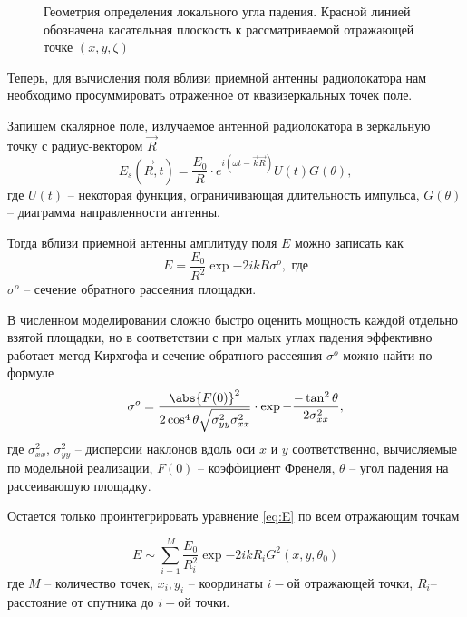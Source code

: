 \begin{figure}[h!]
    \centering
    \def\svgwidth{0.75\linewidth}
    
    \caption{Геометрия определения локального угла падения. Красной линией
    обозначена касательная плоскость к рассматриваемой отражающей точке
$(x,y,\zeta)$}
    \label{fig:local_theta}
\end{figure}


Теперь, для вычисления поля вблизи приемной антенны радиолокатора нам
необходимо просуммировать отраженное от квазизеркальных точек поле.


Запишем скалярное поле, излучаемое антенной радиолокатора в зеркальную точку с радиус-вектором $\vec
R$
\begin{equation}
    E_{s}(\vec R,t) = \frac{E_0}{R}  \cdot  e^{i(\omega t - \vec k \vec
    R)} U(t)G(\theta), 
\end{equation}
где $U(t)$ -- некоторая функция, ограничивающая длительность импульса,
$G(\theta)$ -- диаграмма направленности антенны.



Тогда вблизи приемной антенны амплитуду поля $E$ можно записать как
\begin{equation}
    \label{eq:E}
    E =  \frac{E_0}{R^2} \exp{-2ikR} \sigma^o , \text{ где}
\end{equation}
$\sigma^o$ -- сечение обратного рассеяния площадки.

В численном моделировании сложно быстро оценить мощность каждой отдельно взятой
площадки, но в соответствии с \cite{bass-and-fuks} при малых углах падения
эффективно работает метод Кирхгофа и сечение обратного рассеяния $\sigma^o$
можно найти по формуле
 \begin{equation}
     \label{eq:frenel}
     \sigma^o = \frac{\abs{F(0)}^2}{2\cos^4\theta \sqrt{\sigma^2_{yy}\sigma^2_{xx}}}
     \cdot \exp{-\frac{-\tan^2 \theta}{2 \sigma^2_{xx}}},
 \end{equation}
 где $\sigma_{xx}^2$, $\sigma_{yy}^2$ -- дисперсии наклонов вдоль оси $x$ и $y$
 соответственно, вычисляемые по модельной реализации, $F(0)$ -- коэффициент
 Френеля,  $\theta$ -- угол падения на рассеивающую площадку. 


Остается только проинтегрировать уравнение \eqref{eq:E} по всем отражающим
точкам 

\begin{equation}
    E \sim \sum\limits_{i=1}^{M} \frac{E_0}{R_i^2} \exp{-2ikR_i}
    G^2(x,y,\theta_0)
\end{equation}
где $M$ -- количество точек,  $x_i,y_i$ -- координаты  $i-$ой отражающей точки,
 $R_i$-- расстояние от спутника до  $i-$ой точки.


